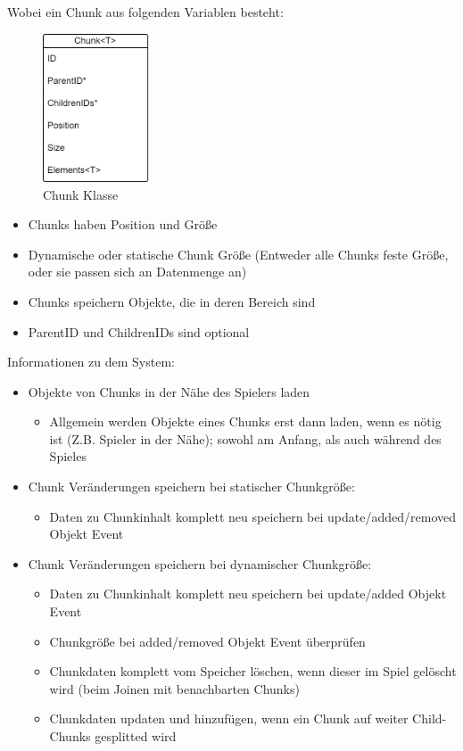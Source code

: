 Wobei ein Chunk aus folgenden Variablen besteht:
\begin{figure}[htp]
    \centering
    \includegraphics[width=0.28\textwidth]{images/Chunk.png}
    \caption{Chunk Klasse}
    \label{fig:chunkClass}
\end{figure}

\begin{itemize}
    \item Chunks haben Position und Größe
    \item Dynamische oder statische Chunk Größe (Entweder alle Chunks feste Größe, oder sie passen sich an Datenmenge an)
    \item Chunks speichern Objekte, die in deren Bereich sind
    \item ParentID und ChildrenIDs sind optional
\end{itemize}

Informationen zu dem System:

\begin{itemize}
    \item Objekte von Chunks in der Nähe des Spielers laden
    \begin{itemize}
        \item Allgemein werden Objekte eines Chunks erst dann laden, wenn es nötig ist (Z.B. Spieler in der Nähe); sowohl am Anfang, als auch während des Spieles
    \end{itemize}
    \item Chunk Veränderungen speichern bei statischer Chunkgröße:
    \begin{itemize}
        \item Daten zu Chunkinhalt komplett neu speichern bei update/added/removed Objekt Event
    \end{itemize}
    \item Chunk Veränderungen speichern bei dynamischer Chunkgröße:
    \begin{itemize}
        \item Daten zu Chunkinhalt komplett neu speichern bei update/added Objekt Event 
        \item Chunkgröße bei added/removed Objekt Event überprüfen
        \item Chunkdaten komplett vom Speicher löschen, wenn dieser im Spiel gelöscht wird (beim Joinen mit benachbarten Chunks)
        \item Chunkdaten updaten und hinzufügen, wenn ein Chunk auf weiter Child-Chunks gesplitted wird
    \end{itemize}
\end{itemize}

